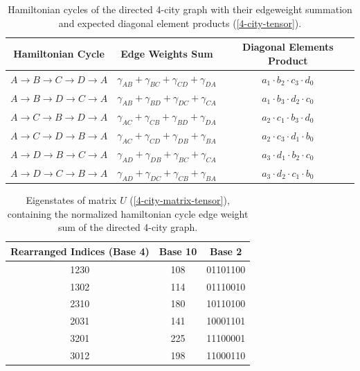 \documentclass[msc,oneside]{ubcthesis}
\begin{document}
	
	\begin{table}[h]
		\centering
		\begin{tabular}{|c|c|c|}
			\hline
			\textbf{Hamiltonian Cycle} & \textbf{Edge Weights Sum} & \textbf{Diagonal Elements Product} \\
			\hline
			$A \rightarrow B \rightarrow C \rightarrow D \rightarrow A$ & $\gamma_{AB} + \gamma_{BC} + \gamma_{CD} + \gamma_{DA}$ & $a_{1} \cdot b_{2} \cdot c_{3} \cdot d_{0}$ \\
			$A \rightarrow B \rightarrow D \rightarrow C \rightarrow A$ & $\gamma_{AB} + \gamma_{BD} + \gamma_{DC} + \gamma_{CA}$ & $a_{1} \cdot b_{3} \cdot d_{2} \cdot c_{0}$ \\
			$A \rightarrow C \rightarrow B \rightarrow D \rightarrow A$ & $\gamma_{AC} + \gamma_{CB} + \gamma_{BD} + \gamma_{DA}$ & $a_{2} \cdot c_{1} \cdot b_{3} \cdot d_{0}$ \\
			$A \rightarrow C \rightarrow D \rightarrow B \rightarrow A$ & $\gamma_{AC} + \gamma_{CD} + \gamma_{DB} + \gamma_{BA}$ & $a_{2} \cdot c_{3} \cdot d_{1} \cdot b_{0}$ \\
			$A \rightarrow D \rightarrow B \rightarrow C \rightarrow A$ & $\gamma_{AD} + \gamma_{DB} + \gamma_{BC} + \gamma_{CA}$ & $a_{3} \cdot d_{1} \cdot b_{2} \cdot c_{0}$ \\
			$A \rightarrow D \rightarrow C \rightarrow B \rightarrow A$ & $\gamma_{AD} + \gamma_{DC} + \gamma_{CB} + \gamma_{BA}$ & $a_{3} \cdot d_{2} \cdot c_{1} \cdot b_{0}$ \\
			\hline
			\end{tabular}
					\caption{Hamiltonian cycles of the directed 4-city graph with their edgeweight summation and expected diagonal element products (\ref{4-city-tensor}).}
			\label{table:ham-cycle-details-4-city}
	\end{table}
	\begin{table}[h]
		\centering
		\begin{tabular}{|c|c|c|}	
			
			\hline
			\textbf{Rearranged Indices (Base 4)} & \textbf{Base 10} & \textbf{Base 2} \\
			\hline
			1230 & 108 & 01101100 \\
			1302 & 114 & 01110010 \\
			2310 & 180 & 10110100 \\
			2031 & 141 & 10001101 \\
			3201 & 225 & 11100001 \\
			3012 & 198 & 11000110 \\
			\hline
		\end{tabular}
		\caption{Eigenstates of matrix $U$ (\ref{4-city-matrix-tensor}), containing the normalized hamiltonian cycle edge weight sum of the directed 4-city graph.}
		\label{table:4-city-conversions}
	\end{table}
	
\end{document}
